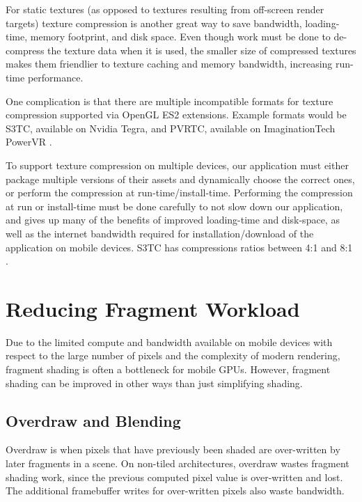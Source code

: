 
For static textures (as opposed to textures resulting from off-screen render
targets) texture compression is another great way to save bandwidth,
loading-time, memory footprint, and disk space.  Even though work must be
done to de-compress the texture data when it is used, the smaller size of
compressed textures makes them friendlier to texture caching and memory
bandwidth, increasing run-time performance. 

One complication is that there are multiple incompatible formats for texture
compression supported via OpenGL ES2 extensions.  Example formats would be S3TC, available on Nvidia Tegra, and PVRTC, available on ImaginationTech PowerVR \cite{motorola_texture}.

To support texture compression on multiple devices, our application must
either package multiple versions of their assets and dynamically choose the
correct ones, or perform the compression at run-time/install-time.  Performing
the compression at run or install-time must be done carefully to not slow down
our application, and gives up many of the benefits of improved loading-time
and disk-space, as well as the internet bandwidth required for
installation/download of the application on mobile devices.  S3TC has
compressions ratios between 4:1 and 8:1 \cite{arb_texture_compresssion}.

\section{Reducing Fragment Workload}
\label{Jon-McCaffrey-Reducing-Fragment-Workload}


Due to the limited compute and bandwidth available on mobile devices with respect to the large number of pixels and the complexity of modern rendering, fragment shading is often a bottleneck for mobile GPUs.  However, fragment shading can be improved in other ways than just simplifying shading.

\subsection{Overdraw and Blending}\label{Jon-McCaffrey-Overdraw-And-Blending}
Overdraw is when pixels that have previously been shaded are over-written by later fragments in a scene.  On non-tiled architectures, overdraw wastes fragment shading work, since the previous computed pixel value is over-written and lost.  The additional framebuffer writes for over-written pixels also waste bandwidth.

